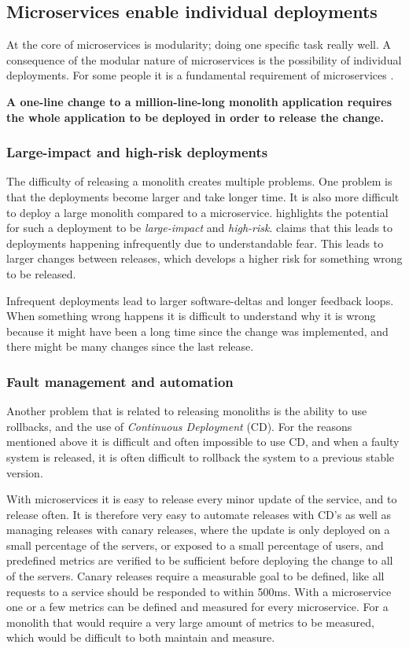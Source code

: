 \documentclass{article}
\begin{document}
\subsection{Microservices enable individual deployments}
At the core of microservices is modularity; doing one specific task really well. A consequence of the modular nature of microservices is the possibility of individual deployments. For some people it is a fundamental requirement of microservices \cite{Newman2015}.

\textbf{A one-line change to a million-line-long monolith application requires the whole application to be deployed in order to release the change.}\cite[p.~6]{Newman2015}

\subsubsection{Large-impact and high-risk deployments}
The difficulty of releasing a monolith creates multiple problems. One problem is that the deployments become larger and take longer time. It is also more difficult to deploy a large monolith compared to a microservice. \citeauthor{Newman2015} highlights the potential for such a deployment to be \textit{large-impact} and \textit{high-risk}. \citeauthor{Newman2015} claims that this leads to deployments happening infrequently due to understandable fear. This leads to larger changes between releases, which develops a higher risk for something wrong to be released. \cite[p.~6]{Newman2015}

Infrequent deployments lead to larger software-deltas and longer feedback loops. When something wrong happens it is difficult to understand why it is wrong because it might have been a long time since the change was implemented, and there might be many changes since the last release.

\subsubsection{Fault management and automation}
Another problem that is related to releasing monoliths is the ability to use rollbacks, and the use of \textit{Continuous Deployment} (CD). For the reasons mentioned above it is difficult and often impossible to use CD, and when a faulty system is released, it is often difficult to rollback the system to a previous stable version.

With microservices it is easy to release every minor update of the service, and to release often. It is therefore very easy to automate releases with CD's as well as managing releases with canary releases, where the update is only deployed on a small percentage of the servers, or exposed to a small percentage of users, and predefined metrics are verified to be sufficient before deploying the change to all of the servers. Canary releases require a measurable goal to be defined, like all requests to a service should be responded to within 500ms. With a microservice one or a few metrics can be defined and measured for every microservice. For a monolith that would require a very large amount of metrics to be measured, which would be difficult to both maintain and measure.
\end{document}
